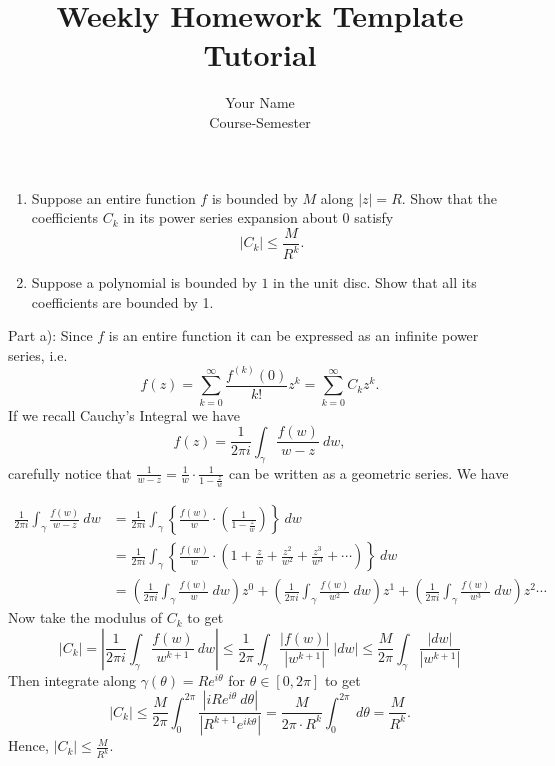 \documentclass[12pt]{article}
\newenvironment{solution}[2][Solution]{\begin{trivlist}
\item[\hskip \labelsep {\bfseries #1}]}{\end{trivlist}}
\newenvironment{problem}[2][Problem]{\begin{trivlist}
\item[\hskip \labelsep {\bfseries #1}\hskip \labelsep {\bfseries #2.}]}{\end{trivlist}}
\begin{document}
 
 
\title{Weekly Homework Template Tutorial}%
\author{Your Name\\ %
Course-Semester} %
 
\maketitle
\begin{problem}{6}
\begin{enumerate}[label=\alph*)]
    \item Suppose an entire function $f$ is bounded by $M$ along $|z|=R$. Show that the coefficients $C_k$ in its power series expansion about $0$ satisfy
    \[
    |C_k|\leq\frac{M}{R^k}.
    \]
    \item Suppose a polynomial is bounded by $1$ in the unit disc. Show that all its coefficients are bounded by 1.
\end{enumerate}
\end{problem}

\begin{solution}{}
Part a): Since $f$ is an entire function it can be expressed as an infinite power series, i.e.
\[
f(z)=\sum_{k=0}^\infty\frac{f^{(k)}(0)}{k!}z^k=\sum_{k=0}^\infty C_kz^k.
\]
If we recall Cauchy's Integral we have
\[
f(z)=\frac{1}{2\pi i}\int_\gamma\frac{f(w)}{w-z}\ dw,
\]
carefully notice that $\frac{1}{w-z}=\frac{1}{w}\cdot\frac{1}{1-\frac{z}{w}}$ can be written as a geometric series. We have

\begin{align*}
\frac{1}{2\pi i}\int_\gamma\frac{f(w)}{w-z}\ dw &=\frac{1}{2\pi i}\int_\gamma\left\lbrace\frac{f(w)}{w}\cdot\left(\frac{1}{1-\frac{z}{w}}\right) \right\rbrace\ dw\\[8pt]
&=\frac{1}{2\pi i}\int_\gamma\left\lbrace\frac{f(w)}{w}\cdot\left(1+\frac{z}{w}+\frac{z^2}{w^2}+\frac{z^3}{w^3}+\cdots\right) \right\rbrace\ dw\\[8pt]
&=\left(\frac{1}{2\pi i}\int_\gamma \frac{f(w)}{w}\ dw\right)z^0+\left(\frac{1}{2\pi i}\int_\gamma \frac{f(w)}{w^2}\ dw\right)z^1+\left(\frac{1}{2\pi i}\int_\gamma \frac{f(w)}{w^3}\ dw\right)z^2\cdots
\end{align*}
Now take the modulus of $C_k$ to get
\[
|C_k|=\left\lvert\frac{1}{2\pi i}\int_\gamma \frac{f(w)}{w^{k+1}}\ dw \right\rvert\leq\frac{1}{2\pi}\int_\gamma\frac{|f(w)|}{|w^{k+1}|}\ |dw|\leq \frac{M}{2\pi}\int_\gamma\frac{|dw|}{|w^{k+1}|}
\]
Then integrate along $\gamma(\theta)=Re^{i\theta}$ for $\theta\in [0,2\pi]$ to get
\[
|C_k|\leq \frac{M}{2\pi}\int_0^{2\pi}\frac{|iRe^{i\theta}\ d\theta|}{|R^{k+1}e^{ik\theta}|}=\frac{M}{2\pi\cdot R^k}\int_0^{2\pi}\ d\theta=\frac{M}{R^k}.
\]
Hence, $|C_k|\leq \frac{M}{R^k}$.
\end{solution}
\pagebreak
\end{document}
